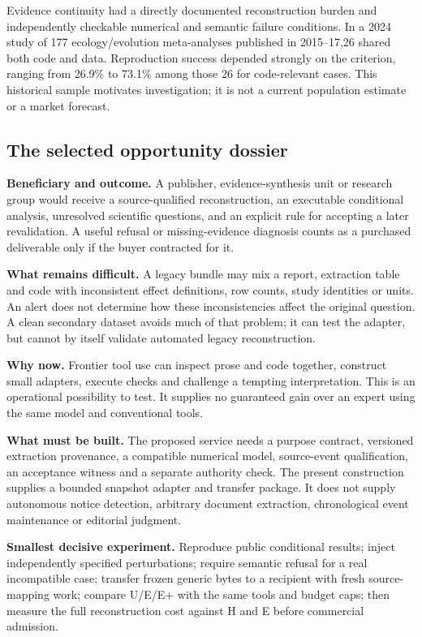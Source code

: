 \documentclass[11pt]{article}
\begin{document}
Evidence continuity had a directly documented reconstruction burden and independently checkable numerical and semantic failure conditions. In a 2024 study of 177 ecology/evolution meta-analyses published in 2015–17,26 shared both code and data. Reproduction success depended strongly on the criterion, ranging from 26.9\% to 73.1\% among those 26 for code-relevant cases. This historical sample motivates investigation; it is not a current population estimate or a market forecast.\citep{kambouris}

\subsection{The selected opportunity dossier}

\textbf{Beneficiary and outcome.} A publisher, evidence-synthesis unit or research group would receive a source-qualified reconstruction, an executable conditional analysis, unresolved scientific questions, and an explicit rule for accepting a later revalidation. A useful refusal or missing-evidence diagnosis counts as a purchased deliverable only if the buyer contracted for it.

\textbf{What remains difficult.} A legacy bundle may mix a report, extraction table and code with inconsistent effect definitions, row counts, study identities or units. An alert does not determine how these inconsistencies affect the original question. A clean secondary dataset avoids much of that problem; it can test the adapter, but cannot by itself validate automated legacy reconstruction.

\textbf{Why now.} Frontier tool use can inspect prose and code together, construct small adapters, execute checks and challenge a tempting interpretation. This is an operational possibility to test. It supplies no guaranteed gain over an expert using the same model and conventional tools.

\textbf{What must be built.} The proposed service needs a purpose contract, versioned extraction provenance, a compatible numerical model, source-event qualification, an acceptance witness and a separate authority check. The present construction supplies a bounded snapshot adapter and transfer package. It does not supply autonomous notice detection, arbitrary document extraction, chronological event maintenance or editorial judgment.

\textbf{Smallest decisive experiment.} Reproduce public conditional results; inject independently specified perturbations; require semantic refusal for a real incompatible case; transfer frozen generic bytes to a recipient with fresh source-mapping work; compare U/E/E+ with the same tools and budget caps; then measure the full reconstruction cost against H and E before commercial admission.
\end{document}
